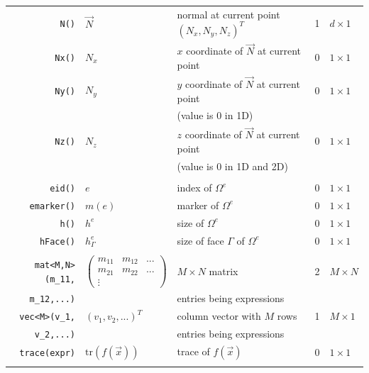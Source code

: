 \documentclass[11pt]{article}
\begin{document}
\begin{longtable}[c]{rllll}

  \lstinline!N()! & $\overrightarrow{N}$ & normal at current point $(N_x,N_y,N_z)^T$ & 1 & $d \times 1$\\

  \lstinline!Nx()! & $N_x$ & $x$ coordinate of $\overrightarrow{N}$ at current point & 0 & $1 \times 1$\\

  \lstinline!Ny()! & $N_y$ & $y$ coordinate of $\overrightarrow{N}$ at current point & 0 & $1 \times 1$\\
  & &  (value is 0 in 1D) & &\\

  \lstinline!Nz()! & $N_z$ & $z$ coordinate of $\overrightarrow{N}$ at current point& 0 & $1 \times 1$\\
  & &  (value is 0 in 1D and 2D)  & &\\\hline\\

  \lstinline!eid()! & $e$ & index of  $\Omega^e$ & 0 & $1 \times 1$\\
  \lstinline!emarker()! & $m(e)$ & marker of  $\Omega^e$ & 0 & $1 \times 1$\\
  \lstinline!h()! & $h^e$ & size of   $\Omega^e$ & 0 & $1 \times 1$\\
  \lstinline!hFace()! & $h^e_{\Gamma}$ & size of face $\Gamma$ of $\Omega^e$ & 0 & $1 \times 1$\\\hline\\

  \lstinline!mat<M,N>(m_11,! &
  $\begin{pmatrix}
    m_{11} & m_{12} & ...\\
    m_{21} & m_{22} & ...\\
    \vdots & &
  \end{pmatrix}$
  & $M\times N$ matrix    & 2 & $M \times N$\\
  \lstinline!m_12,...)!& & entries being expressions   & &\\

  \lstinline!vec<M>(v_1,! &$(v_1, v_2,...)^T$
  & column vector with $M$ rows    & 1 & $M \times 1$\\
  \lstinline!v_2,...)!& & entries being expressions   & &\\

  \lstinline!trace(expr)! &$\mathrm{tr}(f(\overrightarrow{x}))$  & trace of $f(\overrightarrow{x})$   & 0 & $1 \times 1$\\\hline\\



\end{longtable}
\end{document}
